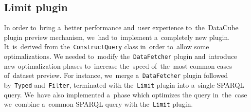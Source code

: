 \subsection{Limit plugin}
In order to~bring a~better performance and~user experience to~the~DataCube plugin
preview mechanism, we~had to~implement a~completely new plugin. It~is~derived 
from the~\texttt{ConstructQuery} class in~order to~allow some optimalizations. 
We needed to~modify the~\texttt{DataFetcher} plugin and~introduce new 
optimalization phases to~increase the~speed of~the~most common cases of~dataset 
preview. For instance, we~merge a~\texttt{DataFetcher} plugin followed by~\texttt{Typed} and~\texttt{Filter}, terminated with the~\texttt{Limit} plugin 
into a~single SPARQL query. We~have also implemented a~phase which optimizes
the query in~the~case we~combine a~common SPARQL query with the~\texttt{Limit} plugin.

